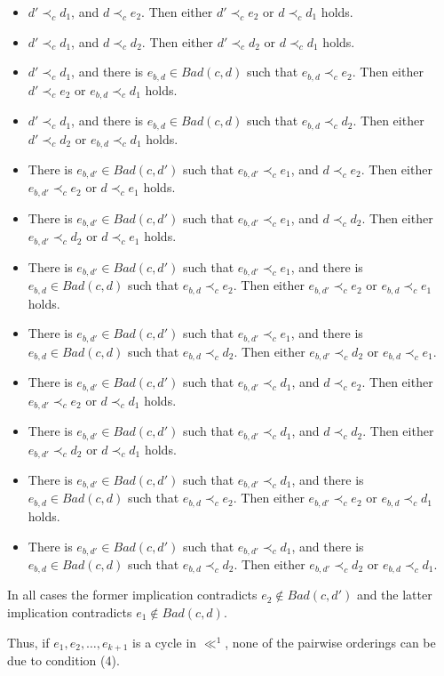 \documentclass{LMCS}
\newcommand{\Bad}[2]{\ensuremath{\mathit{Bad}(#1,#2)}}
\begin{document}
\begin{itemize}
\begin{itemize}
\item $d'\prec_c d_1$, and $d\prec_c e_2$.
Then either $d'\prec_c e_2$ or $d\prec_c d_1$ holds.

\item $d'\prec_c d_1$, and $d\prec_c d_2$.
Then either $d'\prec_c d_2$ or $d\prec_c d_1$ holds.

\item $d'\prec_c d_1$, and there is $e_{b,d}\in \Bad c d$ such that $e_{b,d}\prec_c e_2$.
Then either $d'\prec_c e_2$ or $e_{b,d}\prec_c d_1$ holds.

\item $d'\prec_c d_1$, and there is $e_{b,d}\in \Bad c d$ such that $e_{b,d}\prec_c d_2$.
Then either $d'\prec_c d_2$ or $e_{b,d}\prec_c d_1$ holds.

\item There is $e_{b,d'}\in \Bad c {d'}$ such that $e_{b,d'}\prec_c e_1$, and $d\prec_c e_2$.
Then either $e_{b,d'}\prec_c e_2$ or $d\prec_c e_1$ holds.

\item There is $e_{b,d'}\in \Bad c {d'}$ such that $e_{b,d'}\prec_c e_1$, and $d\prec_c d_2$.
Then either $e_{b,d'}\prec_c d_2$ or $d\prec_c e_1$ holds.

\item There is $e_{b,d'}\in \Bad c {d'}$ such that $e_{b,d'}\prec_c e_1$, and there is $e_{b,d}\in \Bad c d$ such that $e_{b,d}\prec_c e_2$.
Then either $e_{b,d'}\prec_c e_2$ or $e_{b,d}\prec_c e_1$ holds.

\item There is $e_{b,d'}\in \Bad c {d'}$ such that $e_{b,d'}\prec_c e_1$, and there is $e_{b,d}\in \Bad c d$ such that $e_{b,d}\prec_c d_2$.
Then either $e_{b,d'}\prec_c d_2$ or $e_{b,d}\prec_c e_1$.

\item There is $e_{b,d'}\in \Bad c {d'}$ such that $e_{b,d'}\prec_c d_1$, and $d\prec_c e_2$.
Then either $e_{b,d'}\prec_c e_2$ or $d\prec_c d_1$ holds.

\item There is $e_{b,d'}\in \Bad c {d'}$ such that $e_{b,d'}\prec_c d_1$, and $d\prec_c d_2$.
Then either $e_{b,d'}\prec_c d_2$ or $d\prec_c d_1$ holds.

\item There is $e_{b,d'}\in \Bad c {d'}$ such that $e_{b,d'}\prec_c d_1$, and there is $e_{b,d}\in \Bad c d$ such that $e_{b,d}\prec_c e_2$.
Then either $e_{b,d'}\prec_c e_2$ or $e_{b,d}\prec_c d_1$ holds.

\item There is $e_{b,d'}\in \Bad c {d'}$ such that $e_{b,d'}\prec_c d_1$, and there is $e_{b,d}\in \Bad c d$ such that $e_{b,d}\prec_c d_2$.
Then either $e_{b,d'}\prec_c d_2$ or $e_{b,d}\prec_c d_1$.

\end{itemize}
In all cases the former implication contradicts $e_2\notin \Bad c {d'}$ and the latter implication contradicts $e_1\notin \Bad c d$.

\end{itemize}
Thus, if $e_1,e_2,\ldots,e_{k+1}$ is a cycle in $\ll^1$, none of the pairwise orderings can be due to condition (4).
\end{document}
